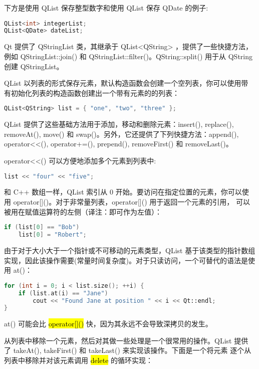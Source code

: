 下方是使用 QList 保存整型数字和使用 QList 保存 QDate 的例子:


\begin{lstlisting}[language=C++]
QList<int> integerList;
QList<QDate> dateList;
\end{lstlisting}

Qt 提供了 QStringList 类，其继承于 QList<QString> ，提供了一些快捷方法，例如 QStringList::join() 和 QStringList::filter()。QString::split() 用于从 QString 创建 QStringList。

QList 以列表的形式保存元素，默认构造函数会创建一个空列表，你可以使用带
有初始化列表的构造函数创建出一个带有元素的的列表：

\begin{lstlisting}[language=C++]
QList<QString> list = { "one", "two", "three" };
\end{lstlisting}

QList 提供了这些基础方法用于添加，移动和删除元素：insert(), replace(), removeAt(), move() 和 swap()。另外，它还提供了下列快捷方法：append(), operator<<(), operator+=(), prepend(), removeFirst() 和 removeLast()。

operator<<() 可以方便地添加多个元素到列表中:

\begin{lstlisting}[language=C++]
list << "four" << "five";
\end{lstlisting}

和 C++ 数组一样，QList 索引从 0 开始。要访问在指定位置的元素，你可以使
用 operator[]()。对于非常量列表，operator[]() 用于返回一个元素的引用，
可以被用在赋值运算符的左侧（译注：即可作为左值）：

\begin{lstlisting}[language=C++]
if (list[0] == "Bob")
    list[0] = "Robert";
\end{lstlisting}

由于对于大小大于一个指针或不可移动的元素类型，QList 基于该类型的指针数组实现，因此该操作需要(常量时间复杂度)。对于只读访问，一个可替代的语法是使用 at()：

\begin{lstlisting}[language=C++]
for (int i = 0; i < list.size(); ++i) {
    if (list.at(i) == "Jane")
        cout << "Found Jane at position " << i << Qt::endl;
}
\end{lstlisting}

at() 可能会比 \hl{operator[]()} 快，因为其永远不会导致深拷贝的发生。

从列表中移除一个元素，然后对其做一些处理是一个很常用的操作。QList 提供
了 takeAt(), takeFirst() 和 takeLast() 来实现该操作。下面是一个将元素
逐个从列表中移除并对该元素调用 \hl{delete} 的循环实现：

